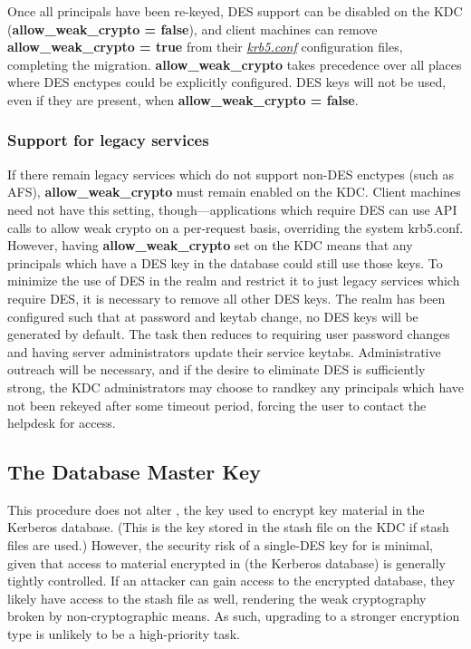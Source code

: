 \documentclass[letterpaper,10pt,english]{sphinxmanual}
\begin{document}
Once all principals have been re-keyed, DES support can be disabled on the
KDC (\textbf{allow\_weak\_crypto = false}), and client machines can remove
\textbf{allow\_weak\_crypto = true} from their {\hyperref[admin/conf_files/krb5_conf:krb5-conf-5]{\emph{krb5.conf}}} configuration
files, completing the migration.  \textbf{allow\_weak\_crypto} takes precedence over
all places where DES enctypes could be explicitly configured.  DES keys will
not be used, even if they are present, when \textbf{allow\_weak\_crypto = false}.


\subsubsection{Support for legacy services}
\label{admin/advanced/retiring-des:support-for-legacy-services}
If there remain legacy services which do not support non-DES enctypes
(such as AFS), \textbf{allow\_weak\_crypto} must remain enabled on the KDC.
Client machines need not have this setting, though---applications
which require DES can use API calls to allow weak crypto on a per-request
basis, overriding the system krb5.conf.  However, having \textbf{allow\_weak\_crypto}
set on the KDC means that any principals which have a DES key in the database
could still use those keys.  To minimize the use of DES in the realm and
restrict it to just legacy services which require DES, it is necessary
to remove all other DES keys.  The realm has been configured such that
at password and keytab change, no DES keys will be generated by default.
The task then reduces to requiring user password changes and having
server administrators update their service keytabs.  Administrative
outreach will be necessary, and if the desire to eliminate DES is
sufficiently strong, the KDC administrators may choose to randkey
any principals which have not been rekeyed after some timeout period,
forcing the user to contact the helpdesk for access.


\subsection{The Database Master Key}
\label{admin/advanced/retiring-des:the-database-master-key}
This procedure does not alter , the key used to encrypt key
material in the Kerberos database.  (This is the key stored in the stash file
on the KDC if stash files are used.)  However, the security risk of
a single-DES key for  is minimal, given that access to material
encrypted in  (the Kerberos database) is generally tightly controlled.
If an attacker can gain access to the encrypted database, they likely
have access to the stash file as well, rendering the weak cryptography
broken by non-cryptographic means.  As such, upgrading  to a stronger
encryption type is unlikely to be a high-priority task.
\end{document}
